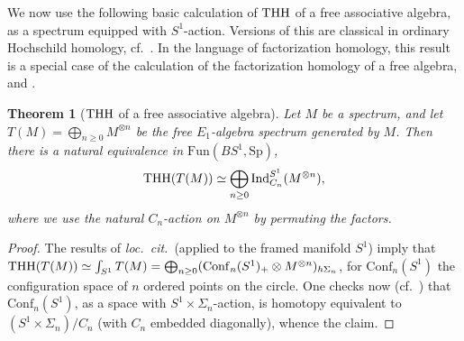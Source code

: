 \documentclass{amsart}
\renewcommand{\sp}{\mathrm{Sp}}
\newtheorem{theorem}{Theorem}[section]
\theoremstyle{definition}
\newcommand{\fun}{\mathrm{Fun}}
\begin{document}
We now use the following basic calculation of $\mathrm{THH}$ of a free associative
algebra, as a spectrum equipped with $S^1$-action. 
Versions of this are classical in ordinary Hochschild homology,
cf.~\cite[Sec.~3.1]{Loday}. 
In the language of factorization homology, this result is a special case
of the calculation of the factorization homology of a free algebra,
\cite[Prop.~4.13]{AFT} and \cite[Prop.~5.5]{AF15}. 

\begin{theorem}[$\mathrm{THH}$ of a free associative algebra] 
Let $M$ be a spectrum, and let $T(M) = \bigoplus_{n \geq 0}M^{\otimes n}$ be the
free $E_1$-algebra spectrum
generated by $M$. 
Then there is a natural equivalence
in $\fun(BS^1, \sp)$,
\begin{equation} \label{THHtensor}  \mathrm{THH}( T(M)) \simeq \bigoplus_{n \geq 0} \mathrm{Ind}_{C_n}^{S^1} (M^{\otimes
n}) , \end{equation}
where we use the natural $C_n$-action on $M^{\otimes n}$ by permuting the
factors. 
\end{theorem} 
\begin{proof} 
The results of \emph{loc.~cit.}~(applied to the 
framed manifold $S^1$) imply that 
$\mathrm{THH}( T(M)) \simeq \int_{S^1} T(M) = \bigoplus_{n \geq 0} (\mathrm{Conf}_n(S^1)_+ \otimes M^{\otimes
n})_{h \Sigma_n}$, for $\mathrm{Conf}_n(S^1)$ the configuration space of $n$
ordered points on the circle. 
One checks now (cf.~\cite[Ex.~II.14.4]{CJ98}) that $\mathrm{Conf}_n(S^1)$, as a
space with $S^1 \times \Sigma_n$-action, 
is homotopy equivalent to $(S^1 \times  \Sigma_n)/C_n$ (with $C_n$ embedded
diagonally), whence the claim. 
\end{proof} 
\end{document}
